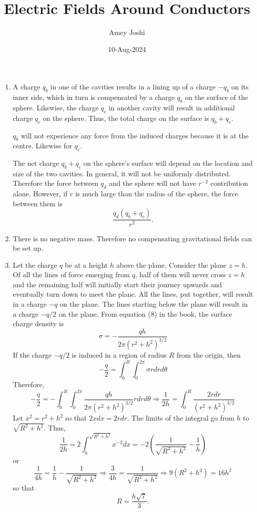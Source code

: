 \documentclass{article}
\begin{document}
%
\title{Electric Fields Around Conductors}
\author{Amey Joshi}
\date{10-Aug-2024}
\maketitle
\begin{enumerate}
\item A charge $q_b$ in one of the cavities results in a lining up of a charge
$-q_b$ on its inner side, which in turn is compensated by a charge $q_b$ on the
surface of the sphere. Likewise, the charge $q_c$ in another cavity will result
in additional charge $q_c$ on the sphere. Thus, the total charge on the surface
is $q_b + q_c$.

$q_b$ will not experience any force from the induced charges because it is at the
centre. Likewise for $q_c$.

The net charge $q_b + q_c$ on the sphere's surface will depend on the location 
and size of the two cavities. In general, it will not be uniformly distributed.
Therefore the force between $q_d$ and the sphere will not have $r^{-2}$ contribution
alone. However, if $r$ is much large than the radius of the sphere, the force
between them is
\[
\frac{q_d(q_b + q_c)}{r^2}.
\]

\item There is no negative mass. Therefore no compensating gravitational fields
can be set up.

\item Let the charge $q$ be at a height $h$ above the plane. Consider the plane
$z = h$. Of all the lines of force emerging from $q$, half of them will never 
cross $z = h$ and the remaining half will initially start their journey upwards
and eventually turn down to meet the plane. All the lines, put together, will
result in a charge $-q$ on the plane. The lines starting below the plane will
result in a charge $-q/2$ on the plane. From equation (8) in the book, the surface
charge density is
\[
\sigma = -\frac{qh}{2\pi(r^2 + h^2)^{3/2}}
\]
If the charge $-q/2$ is induced in a region of radius $R$ from the origin, then
\[
-\frac{q}{2} = \int_0^R\int_0^{2\pi}\sigma rdrd\theta
\]
Therefore,
\[
-\frac{q}{2} = -\int_0^R\int_0^{2\pi}\frac{qh}{2\pi(r^2 + h^2)^{3/2}} rdrd\theta
\Rightarrow
\frac{1}{2h} = \int_0^R \frac{2rdr}{(r^2 + h^2)^{3/2}}
\]
Let $x^2 = r^2 + h^2$ so that $2xdx = 2rdr$. The limits of the integral go from
$h$ to $\sqrt{R^2 + h^2}$. Thus,
\[
\frac{1}{2h} = 2\int_h^{\sqrt{R^2+h^2}} x^{-2}dx = 
-2\left(\frac{1}{\sqrt{R^2+h^2}} - \frac{1}{h}\right)
\]
or
\[
\frac{1}{4h} = \frac{1}{h} - \frac{1}{\sqrt{R^2+h^2}} \Rightarrow
\frac{3}{4h} = \frac{1}{\sqrt{R^2+h^2}} \Rightarrow
9(R^2 + h^2) = 16h^2
\]
so that
\[
R = \frac{h\sqrt{7}}{3}.
\]


\end{enumerate}
\end{document}
